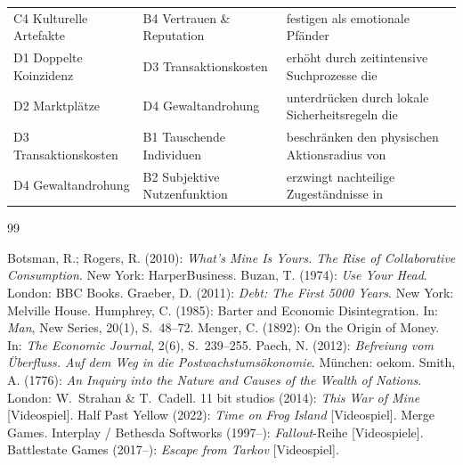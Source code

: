 \documentclass[11pt, a4paper]{article}
\begin{document}
{\begin{longtable}{@{}p{4.2cm}p{4.2cm}p{7.6cm}@{}}
C4 Kulturelle Artefakte & B4 Vertrauen \& Reputation & festigen als emotionale Pfänder \\
D1 Doppelte Koinzidenz & D3 Transaktionskosten & erhöht durch zeitintensive Suchprozesse die \\
D2 Marktplätze & D4 Gewaltandrohung & unterdrücken durch lokale Sicherheitsregeln die \\
D3 Transaktionskosten & B1 Tauschende Individuen & beschränken den physischen Aktionsradius von \\
D4 Gewaltandrohung & B2 Subjektive Nutzenfunktion & erzwingt nachteilige Zugeständnisse in \\
\bottomrule
\end{longtable}
}

\begin{thebibliography}{99}
\small
{} Botsman, R.; Rogers, R. (2010): \emph{What's Mine Is
    Yours. The Rise of Collaborative Consumption}. New York: HarperBusiness.
 Buzan, T. (1974): \emph{Use Your Head}. London: BBC Books.
 Graeber, D. (2011): \emph{Debt: The First 5000 Years}.
    New York: Melville House.
 Humphrey, C. (1985): Barter and Economic
    Disintegration. In: \emph{Man}, New Series, 20(1), S.~48--72.
 Menger, C. (1892): On the Origin of Money. In:
    \emph{The Economic Journal}, 2(6), S.~239--255.
 Paech, N. (2012): \emph{Befreiung vom Überfluss. Auf dem
    Weg in die Postwachstumsökonomie}. München: oekom.
 Smith, A. (1776): \emph{An Inquiry into the Nature and
    Causes of the Wealth of Nations}. London: W.~Strahan \& T.~Cadell.
 11 bit studios (2014): \emph{This War of Mine} [Videospiel].
 Half Past Yellow (2022): \emph{Time on Frog Island}
    [Videospiel]. Merge Games.
 Interplay / Bethesda Softworks (1997--): \emph{Fallout}-Reihe
    [Videospiele].
 Battlestate Games (2017--): \emph{Escape from Tarkov} [Videospiel].
\end{thebibliography}
\end{document}
